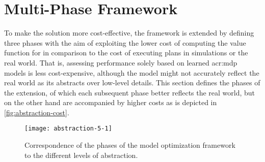 \section{Multi-Phase Framework}
\label{sec:multi-phase-framework}

To make the solution more cost-effective, the framework is extended by defining three phases with the aim of exploiting the lower cost of computing the value function for  in comparison to the cost of executing plans in simulations or the real world.
That is, assessing performance solely based on learned \acrshort{acr:mdp} models is less cost-expensive, although the model might not accurately reflect the real world as its abstracts over low-level details.
This section defines the phases of the extension, of which each subsequent phase better reflects the real world, but on the other hand are accompanied by higher costs as is depicted in \autoref{fig:abstraction-cost}.

\begin{figure}[t]
	\centering
	\texttt{[image: abstraction-5-1]}
	\caption{Correspondence of the phases of the model optimization framework to the different levels of abstraction.}
	\label{fig:abstraction-cost}
\end{figure}


